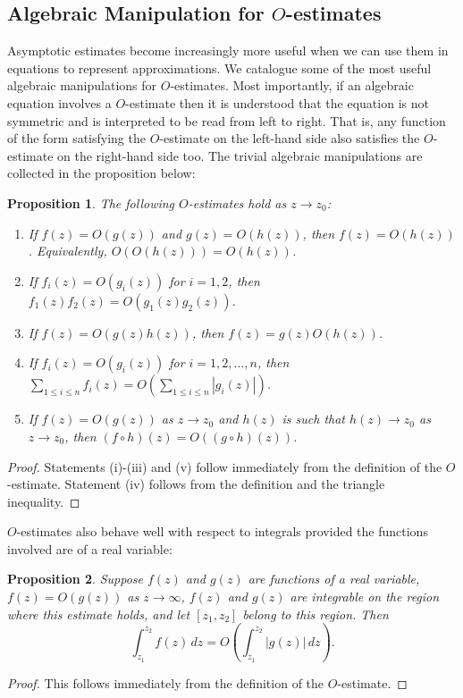 \documentclass[12pt]{book}
\newtheorem{proposition}{Proposition}[section]
\theoremstyle{definition}\newframedtheorem{method}{Method}
\newcommand{\<}{\langle}
\renewcommand{\>}{\rangle}
\begin{document}
    \subsection*{Algebraic Manipulation for \texorpdfstring{$O$}{O}-estimates}
      Asymptotic estimates become increasingly more useful when we can use them in equations to represent approximations. We catalogue some of the most useful algebraic manipulations for $O$-estimates. Most importantly, if an algebraic equation involves a $O$-estimate then it is understood that the equation is not symmetric and is interpreted to be read from left to right. That is, any function of the form satisfying the $O$-estimate on the left-hand side also satisfies the $O$-estimate on the right-hand side too. The trivial algebraic manipulations are collected in the proposition below:

      \begin{proposition}\label{prop:Big_Oh_manipulations}
          The following $O$-estimates hold as $z \to z_{0}$:
          \begin{enumerate}[label=(\roman*)]
            \item If $f(z) = O(g(z))$ and $g(z) = O(h(z))$, then $f(z) = O(h(z))$. Equivalently, $O(O(h(z))) = O(h(z))$.
            \item If $f_{i}(z) = O(g_{i}(z))$ for $i = 1,2$, then $f_{1}(z)f_{2}(z) = O(g_{1}(z)g_{2}(z))$.
            \item If $f(z) = O(g(z)h(z))$, then $f(z) = g(z)O(h(z))$.
            \item If $f_{i}(z) = O(g_{i}(z))$ for $i = 1,2,\ldots,n$, then $\sum_{1 \le i \le n}f_{i}(z) = O\left(\sum_{1 \le i \le n}|g_{i}(z)|\right)$.
            \item If $f(z) = O(g(z))$ as $z \to z_{0}$ and $h(z)$ is such that $h(z) \to z_{0}$ as $z \to z_{0}$, then $(f \circ h)(z) = O((g \circ h)(z))$.
          \end{enumerate}
      \end{proposition}
      \begin{proof}
        Statements (i)-(iii) and (v) follow immediately from the definition of the $O$-estimate. Statement (iv) follows from the definition and the triangle inequality.
      \end{proof}

      $O$-estimates also behave well with respect to integrals provided the functions involved are of a real variable:

      \begin{proposition}
        Suppose $f(z)$ and $g(z)$ are functions of a real variable, $f(z) = O(g(z))$ as $z \to \infty$, $f(z)$ and $g(z)$ are integrable on the region where this estimate holds, and let $[z_{1},z_{2}]$ belong to this region. Then
        \[
          \int_{z_{1}}^{z_{2}}f(z)\,dz = O\left(\int_{z_{1}}^{z_{2}}|g(z)|\,dz\right).
        \]
      \end{proposition}
      \begin{proof}
        This follows immediately from the definition of the $O$-estimate.
      \end{proof}
\end{document}
